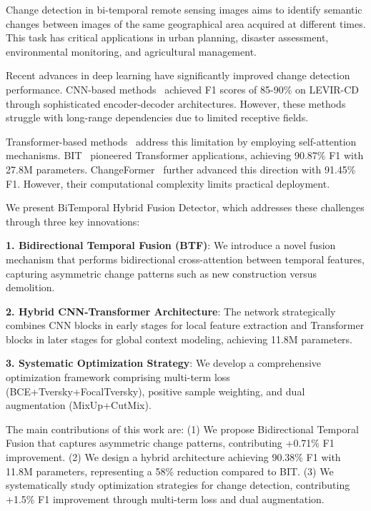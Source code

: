 \documentclass{IEEEtran}
\begin{document}
Change detection in bi-temporal remote sensing images aims to identify semantic changes between images of the same geographical area acquired at different times. This task has critical applications in urban planning, disaster assessment, environmental monitoring, and agricultural management.

Recent advances in deep learning have significantly improved change detection performance. CNN-based methods~\cite{daudt2018fully,daudt2018semantic,fang2021snunet} achieved F1 scores of 85-90\% on LEVIR-CD through sophisticated encoder-decoder architectures. However, these methods struggle with long-range dependencies due to limited receptive fields.

Transformer-based methods~\cite{chen2021beat,mondal2022changeformer} address this limitation by employing self-attention mechanisms. BIT~\cite{chen2021beat} pioneered Transformer applications, achieving 90.87\% F1 with 27.8M parameters. ChangeFormer~\cite{mondal2022changeformer} further advanced this direction with 91.45\% F1. However, their computational complexity limits practical deployment.

We present BiTemporal Hybrid Fusion Detector, which addresses these challenges through three key innovations:

\textbf{1. Bidirectional Temporal Fusion (BTF)}: We introduce a novel fusion mechanism that performs bidirectional cross-attention between temporal features, capturing asymmetric change patterns such as new construction versus demolition.

\textbf{2. Hybrid CNN-Transformer Architecture}: The network strategically combines CNN blocks in early stages for local feature extraction and Transformer blocks in later stages for global context modeling, achieving 11.8M parameters.

\textbf{3. Systematic Optimization Strategy}: We develop a comprehensive optimization framework comprising multi-term loss (BCE+Tversky+FocalTversky), positive sample weighting, and dual augmentation (MixUp+CutMix).

The main contributions of this work are: (1) We propose Bidirectional Temporal Fusion that captures asymmetric change patterns, contributing +0.71\% F1 improvement. (2) We design a hybrid architecture achieving 90.38\% F1 with 11.8M parameters, representing a 58\% reduction compared to BIT. (3) We systematically study optimization strategies for change detection, contributing +1.5\% F1 improvement through multi-term loss and dual augmentation.
\end{document}

